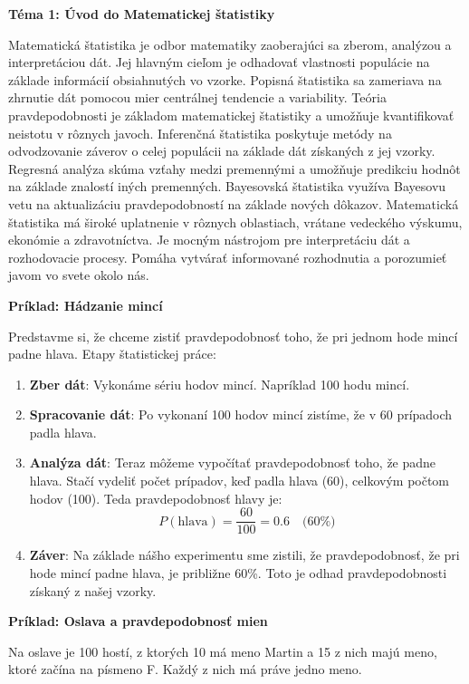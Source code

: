 \textbf{Téma 1: Úvod do Matematickej štatistiky}

Matematická štatistika je odbor matematiky zaoberajúci sa zberom, analýzou a interpretáciou dát. Jej hlavným cieľom je odhadovať vlastnosti populácie na základe informácií obsiahnutých vo vzorke. Popisná štatistika sa zameriava na zhrnutie dát pomocou mier centrálnej tendencie a variability. Teória pravdepodobnosti je základom matematickej štatistiky a umožňuje kvantifikovať neistotu v rôznych javoch. Inferenčná štatistika poskytuje metódy na odvodzovanie záverov o celej populácii na základe dát získaných z jej vzorky. Regresná analýza skúma vzťahy medzi premennými a umožňuje predikciu hodnôt na základe znalostí iných premenných. Bayesovská štatistika využíva Bayesovu vetu na aktualizáciu pravdepodobností na základe nových dôkazov. Matematická štatistika má široké uplatnenie v rôznych oblastiach, vrátane vedeckého výskumu, ekonómie a zdravotníctva. Je mocným nástrojom pre interpretáciu dát a rozhodovacie procesy. Pomáha vytvárať informované rozhodnutia a porozumieť javom vo svete okolo nás.

\textbf{Príklad: Hádzanie mincí}

Predstavme si, že chceme zistiť pravdepodobnosť toho, že pri jednom hode mincí padne hlava. Etapy štatistickej práce:

\begin{enumerate}
    \item \textbf{Zber dát}: Vykonáme sériu hodov mincí. Napríklad 100 hodu mincí.
    \item \textbf{Spracovanie dát}: Po vykonaní 100 hodov mincí zistíme, že v 60 prípadoch padla hlava.
    \item \textbf{Analýza dát}: Teraz môžeme vypočítať pravdepodobnosť toho, že padne hlava. Stačí vydeliť počet prípadov, keď padla hlava (60), celkovým počtom hodov (100). Teda pravdepodobnosť hlavy je:
    \[
        P(\text{hlava}) = \frac{60}{100} = 0.6 \quad \text{(60\%)}
    \]
    \item \textbf{Záver}: Na základe nášho experimentu sme zistili, že pravdepodobnosť, že pri hode mincí padne hlava, je približne 60\%. Toto je odhad pravdepodobnosti získaný z našej vzorky.
\end{enumerate}

\textbf{Príklad: Oslava a pravdepodobnosť mien}

Na oslave je 100 hostí, z ktorých 10 má meno Martin a 15 z nich majú meno, ktoré začína na písmeno F. Každý z nich má práve jedno meno.

